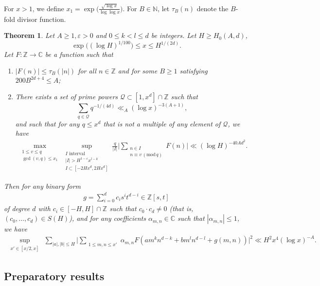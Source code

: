 \documentclass[reqno, 11pt]{amsart}
\renewcommand{\leq}{\leqslant}
\renewcommand{\geq}{\geqslant}
\newtheorem{Theorem}[theorem]{Theorem}
\theoremstyle{definition}
\theoremstyle{definition}
\renewcommand{\geq}{\geqslant}
\renewcommand{\leq}{\leqslant}
\renewcommand{\mod}{\mathrm{mod}\,}
\newcommand{\eps}{\varepsilon}
\newcommand{\CC}{\mathbb{C}}
\newcommand{\ZZ}{\mathbb{Z}}
\newcommand{\NN}{\mathbb{N}}
\numberwithin{equation}{section}
\begin{document}
For $x > 1$, we define $x_1 = \exp \big(\frac{\sqrt{\log x}}{\log \log x}\big)$.
For $B \in \NN$, let $\tau_B(n)$ denote the $B$-fold divisor function.

\begin{Theorem}\label{prop_general}
	Let $A \geq 1, \eps > 0$ and $0 \leq k < l \leq d$ be integers. Let $H \geq H_0(A, d)$,
 $$\exp \Big( (\log H)^{1/100} \Big) \leq x \leq H^{1/(2d)}.$$
 Let $F: \ZZ \rightarrow \CC$ be a function such that
	\begin{enumerate}
		\item $|F(n)| \leq \tau_B(|n|)$ for all $n \in \ZZ$ and for some $B \geq 1$ satisfying $200B^{2d+4} \leq A$;
		\item There exists a set of prime powers $\mathcal{Q} \subset [1, x^d] \cap \ZZ$ such that $$\sum_{q \in \mathcal{Q}} q^{-1/(4d)} \ll_A (\log x)^{-3(A+1)},$$ and such that for any $q \leq x^d$ that is not a multiple of any element of $\mathcal{Q}$, we have
		\begin{eqnarray*}
			\max_{\substack{1 \leq v \leq q \\ \gcd(v, q) \leq x_1}} \sup_{\substack{I \text{ interval} \\ |I| > H^{1 - \eps}x^{l-k} \\ I \subset [-2Hx^d, 2Hx^d]}} \frac{q}{|I|} \Big| \sum_{\substack{n \in I \\ n \equiv v \, (\mod q)}} F(n) \Big| \ll (\log H)^{-40Ad^2}.
		\end{eqnarray*}
	\end{enumerate}
	Then for any binary form 
 \begin{align}\label{g-form}
     g = \sum_{i = 0}^d c_i s^i t^{d-i} \in \ZZ[s,t]
 \end{align}
	of degree $d$ with $c_i \in [-H, H] \cap \ZZ$ such that $c_0 \cdot c_d \neq 0$ (that is, $(c_0,\dots,c_d) \in S(H)$), and for any coefficients $\alpha_{m,n} \in \CC$ such that $|\alpha_{m,n}| \leq 1$, we have 
\begin{align*}
		\sup_{\substack{x' \in [x/2, x]}} \, \sum_{|a|,|b| \leq H} \Big| \sum_{\substack{1 \leq m, n \leq x'}} \alpha_{m,n} F(am^kn^{d-k} + bm^ln^{d-l} + g(m, n)) \Big|^2 \ll H^2 x^4 (\log x)^{-A}.
\end{align*}
\end{Theorem}

\subsection{Preparatory results}
\end{document}
